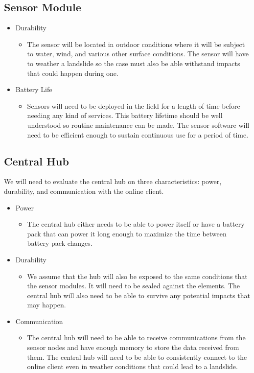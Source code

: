 \documentclass[onecolumn, draftclsnofoot,10pt, compsoc]{IEEEtran}
\begin{document}
\subsection{Sensor Module}
\begin{itemize}
    \item Durability
        \begin{itemize}
            \item The sensor will be located in outdoor conditions where it will be subject to water, wind, and various other surface conditions. The sensor will have to weather a landslide so the case must also be able withstand impacts that could happen during one.
        \end{itemize}
    \item Battery Life
    \begin{itemize}
            \item Sensors will need to be deployed in the field for a length of time before needing any kind of services. This battery lifetime should be well understood so routine maintenance can be made. The sensor software will need to be efficient enough to sustain continuous use for a period of time. 
        \end{itemize}
\end{itemize}
\subsection{Central Hub}
We will need to evaluate the central hub on three characteristics: power, durability, and communication with the online client.
\begin{itemize}
    \item Power
        \begin{itemize}
            \item The central hub either needs to be able to power itself or have a battery pack that can power it long enough to maximize the time between battery pack changes.
        \end{itemize}
    \item Durability
        \begin{itemize}
            \item We assume that the hub will also be exposed to the same conditions that the sensor modules. It will need to be sealed against the elements. The central hub will also need to be able to survive any potential impacts that may happen.
        \end{itemize}
    \item Communication
        \begin{itemize}
            \item The central hub will need to be able to receive communications from the sensor nodes and have enough memory to store the data received from them. The central hub will need to be able to consistently connect to the online client even in weather conditions that could lead to a landslide.
        \end{itemize}
\end{itemize}
\end{document}

